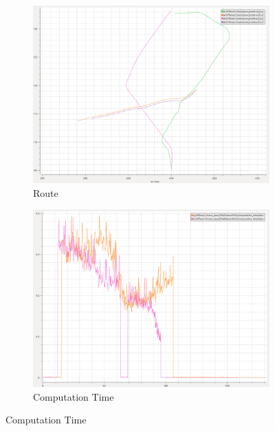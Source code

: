         \begin{figure}[H]
        \centering
        
            \begin{subfigure}[b]{0.45\textwidth}
                \centering
                \includegraphics[width=\textwidth]{figs/Chap5/plot_cr_w_vs_wo.png}
                \caption{Route}
                \label{fig:plot_cr_w_vs_wo}
            \end{subfigure}
            \begin{subfigure}[b]{0.45\textwidth}
                \centering
                \includegraphics[width=\textwidth]{figs/Chap5/plot_cr_w_vs_wo_CT.png}
                \caption{Computation Time}
                \label{fig:plot_cr_w_vs_wo_CT}
            \end{subfigure}
            

\end{figure}
